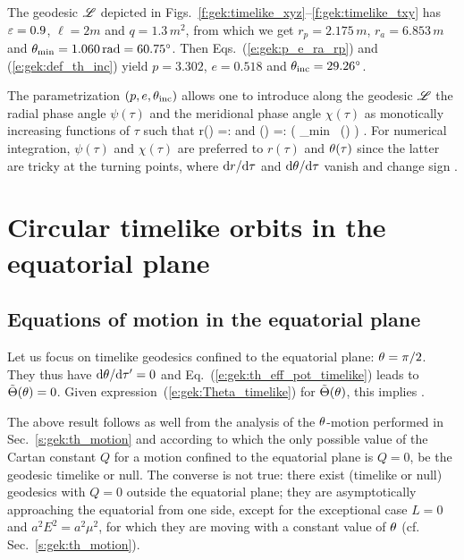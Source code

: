 \begin{example}
The geodesic $\mathscr{L}$ depicted in Figs.~\ref{f:gek:timelike_xyz}--\ref{f:gek:timelike_txy}
has $\varepsilon=0.9$, $\ell=2 m$ and $q=1.3\, m^2$, from which we get
$r_p = 2.175\, m$,
$r_a = 6.853\, m$ and $\theta_{\rm min} = 1.060\, {\rm rad} = 60.75^\circ$.
Then Eqs.~(\ref{e:gek:p_e_ra_rp}) and (\ref{e:gek:def_th_inc}) yield
$p=3.302$, $e=0.518$ and $\theta_{\rm inc} = 29.26^\circ$.
\end{example}

The parametrization $(p, e, \theta_{\rm inc})$ allows one to introduce
along the geodesic $\mathscr{L}$ the radial phase angle $\psi(\tau)$ and the
meridional phase angle $\chi(\tau)$ as monotically increasing functions
of $\tau$ such that
\be
    r(\tau) =:  \qquad\mbox{and}\qquad
    \th(\tau) =: \arccos\left( \cos\th_{\rm min} \, \cos\chi(\tau) \right) .
\ee
For numerical integration, $\psi(\tau)$ and $\chi(\tau)$ are preferred
to $r(\tau)$ and $\theta(\tau)$ since the latter are tricky at the
turning points, where $\mathrm{d} r/\mathrm{d}\tau$ and $\mathrm{d}\theta/\mathrm{d}\tau$ vanish and change sign
\cite{DrascH04}.


\section{Circular timelike orbits in the equatorial plane}

\subsection{Equations of motion in the equatorial plane}

Let us focus on timelike geodesics confined to the equatorial plane:
$\theta=\pi/2$. They thus have $\mathrm{d}\theta/\mathrm{d}\tau' = 0$ and Eq.~(\ref{e:gek:th_eff_pot_timelike})
leads to $\tilde{\Theta}(\theta) = 0$. Given expression~(\ref{e:gek:Theta_timelike}) for $\tilde{\Theta}(\theta)$, this
implies
\be \label{e:gek_equat_q_zero}
    .
\ee
\begin{remark}
The above result follows as well from the analysis of the $\theta$-motion performed
in Sec.~\ref{s:gek:th_motion} and according to which the only possible value of
the Cartan constant $Q$
for a motion confined to the equatorial plane is $Q=0$, be the geodesic timelike or null.
The converse is not true: there exist (timelike or null) geodesics with $Q=0$ outside the equatorial
plane; they are asymptotically approaching the equatorial from one side, except for
the exceptional case $L=0$ and $a^2 E^2 = a^2 \mu^2$, for which they are moving with
a constant value of $\theta$ (cf. Sec.~\ref{s:gek:th_motion}).
\end{remark}

